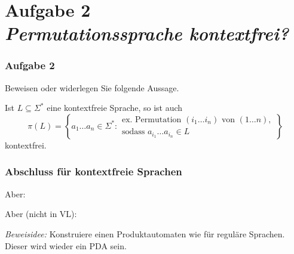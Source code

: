 \documentclass{beamer}
\newcommand{\ghost}[1]{\raisebox{0pt}[0pt][0pt]{\makebox[0pt][l]{#1}}}
\begin{document}
	

	\section{Aufgabe 2 \\ \itshape Permutationssprache kontextfrei?}
	
	\newcommand{\mytabnote}[2]{\ghost{#1}\hspace{2cm}{\textcolor{cdgray}{(#2)}}}

	

	\begin{frame} \frametitle{Aufgabe 2}
		\small
		Beweisen oder widerlegen Sie folgende Aussage.
		
		Ist $L \subseteq \Sigma^*$ eine kontextfreie Sprache, so ist auch
		$$\pi(L) = \left\{ a_1 \ldots a_n \in \Sigma^*: \begin{array}{l} \text{ex. Permutation } (i_1 \ldots i_n) \text{ von } (1 \ldots n), \\ \text{sodass }  a_{i_1} \ldots a_{i_n} \in L \end{array} \right\} $$
		kontextfrei.
	\end{frame}

	\begin{frame}\frametitle{Abschluss für kontextfreie Sprachen}
		\small
		
		Aber: 
		
		
		Aber (nicht in VL):
		
		\textit{Beweisidee:} Konstruiere einen Produktautomaten wie für reguläre Sprachen. Dieser wird wieder ein PDA sein.
	\end{frame}
\end{document}
